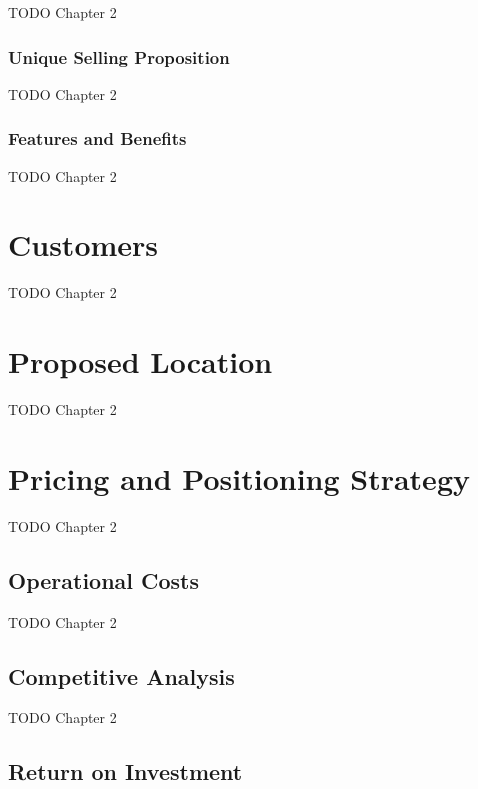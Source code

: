 TODO Chapter 2

\subsubsection*{Unique Selling Proposition}

TODO Chapter 2

\subsubsection*{Features and Benefits}

TODO Chapter 2


\section{Customers}

TODO Chapter 2


\section{Proposed Location}

TODO Chapter 2


\section{Pricing and Positioning Strategy}

TODO Chapter 2

\subsection{Operational Costs}

TODO Chapter 2

\subsection{Competitive Analysis}

TODO Chapter 2

\subsection{Return on Investment}


